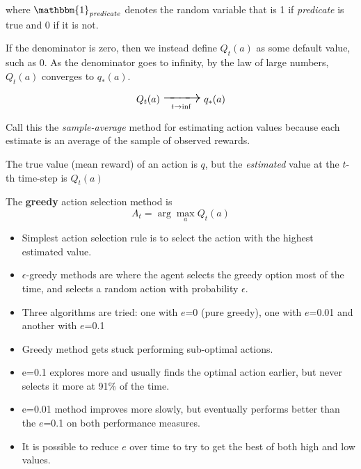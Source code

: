 where $\mathbbm{1}_{\textit{predicate}}$ denotes the random variable that is 1 if \textit{predicate} is true and 0 if it is not.  

If the denominator is zero, then we instead define $Q_t(a)$ as some default value, such as 0. As the denominator goes to infinity, by the law of large numbers, $Q_t(a)$ converges to $q_*(a)$.  


\begin{equation}
\LARGE Q_t(a) \xrightarrow[t \to \inf]{} q_*(a)
\label{eq:sample_average_convergence}
\end{equation}

Call this the \textit{sample-average} method for estimating action values because each
estimate is an average of the sample of observed rewards.


The true value (mean reward) of an action is \(q\), but the \textit{estimated} value at the \(t\)-th time-step
is \(Q_t(a)\)

The \textbf{greedy} action selection method is
\begin{equation}
A_t = \arg\max_a Q_t(a)
\tag{2.2}
\end{equation}

\begin{itemize}
\item Simplest action selection rule is to select the action with the highest estimated value. 
\item $\epsilon$-greedy methods are where the agent selects the greedy option most of the time, and selects a random action with probability $\epsilon$.
\item Three algorithms are tried: one with \(e\)=0 (pure greedy), one with \(e\)=0.01 and another with \(e\)=0.1
\item Greedy method gets stuck performing sub-optimal actions.
\item e=0.1 explores more and usually finds the optimal action earlier, but never selects it more at 91\% of the time.
\item e=0.01 method improves more slowly, but eventually performs better than the \(e\)=0.1 on both performance measures.
\item It is possible to reduce \(e\) over time to try to get the best of both high and low values.
\end{itemize}

